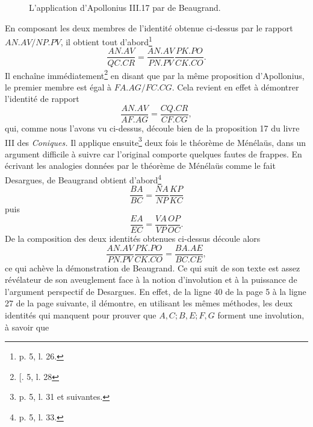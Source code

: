 \documentclass[12pt, a4paper]{article}
\begin{document}
\begin{figure}[!ht]
\caption{L'application d'Apollonius III.17 par de Beaugrand.}\label{Beaugrand-03}
\end{figure}
En composant les deux membres de l'identité obtenue ci-dessus par le rapport $AN.AV/NP.PV$, il obtient tout d'abord\footnote{p. 5, l. 26.} 
\[
\frac{AN.AV}{QC.CR}=\frac{AN.AV}{PN.PV}\frac{PK.PO}{CK.CO}.
\]
Il enchaîne immédiatement\footnote{[. 5, l. 28} en disant que par la même proposition d'Apollonius, le premier membre est égal à $FA.AG/FC.CG$. Cela revient en effet à démontrer l'identité de rapport
\[
\frac{AN.AV}{AF.AG}=\frac{CQ.CR}{CF.CG},
\]
qui, comme nous l'avons vu ci-dessus, découle bien de la proposition 17 du livre III des \textit{Coniques.} Il applique ensuite\footnote{p. 5, l. 31  et suivantes.} deux fois le théorème de Ménélaüs, dans un argument difficile à suivre car l'original comporte quelques fautes de frappes. En écrivant les analogies données par le théorème de Ménélaüs comme le fait Desargues, de Beaugrand obtient d'abord\footnote{p. 5, l. 33.}
\[
\frac{BA}{BC}=\frac{NA}{NP}\frac{KP}{KC}
\]
puis
\[
\frac{EA}{EC}=\frac{VA}{VP}\frac{OP}{OC}.
\]
De la composition des deux identités obtenues ci-dessus découle alors
\[
\frac{AN.AV}{PN.PV}\frac{PK.PO}{CK.CO}=\frac{BA.AE}{BC.CE},
\]
ce qui achève la démonstration de Beaugrand. Ce qui suit de son texte est assez révélateur de son aveuglement face à la notion d'involution et à la puissance de l'argument perspectif de Desargues. En effet, de la ligne 40 de la page 5 à la ligne 27 de la page suivante, il démontre, en utilisant les mêmes méthodes, les deux identités qui manquent pour prouver que $A,C;B,E;F,G$ forment une involution, à savoir que
\end{document}

